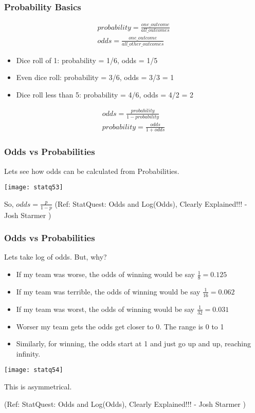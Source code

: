 \begin{frame}[fragile]\frametitle{Probability Basics}

\begin{align}
probability = \frac{one\_outcome}{all\_outcomes} \\
odds = \frac{one\_outcome}{all\_other\_outcomes}
\end{align}
\begin{itemize}
\item Dice roll of 1: probability = 1/6, odds = 1/5
\item Even dice roll: probability = 3/6, odds = 3/3 = 1
\item Dice roll less than 5: probability = 4/6, odds = 4/2 = 2
\end{itemize}
\begin{align}
odds = \frac{probability}{1- probability} \\
probability= \frac{odds }{1+ odds }
\end{align}
\end{frame}

\begin{frame}[fragile]\frametitle{Odds vs Probabilities}

Lets see how odds can be calculated from Probabilities.

\begin{center}
\texttt{[image: statq53]}
\end{center}

So, $odds = \frac{p}{1-p}$
\tiny{(Ref: StatQuest: Odds and Log(Odds), Clearly Explained!!! - Josh Starmer )}
\end{frame}

\begin{frame}[fragile]\frametitle{Odds vs Probabilities}

Lets take log of odds. But, why?

\begin{itemize}
\item If my team was worse, the odds of winning would be say $\frac{1}{8} = 0.125$
\item If my team was terrible, the odds of winning would be say $\frac{1}{16} = 0.062$
\item If my team was worst, the odds of winning would be say $\frac{1}{32} = 0.031$
\item Worser my team gets the odds get closer to 0. The range is 0 to 1
\item Similarly, for winning, the odds start at 1 and just go up and up, reaching infinity.
\end{itemize}

\begin{center}
\texttt{[image: statq54]}
\end{center}

This is asymmetrical.

\tiny{(Ref: StatQuest: Odds and Log(Odds), Clearly Explained!!! - Josh Starmer )}
\end{frame}

